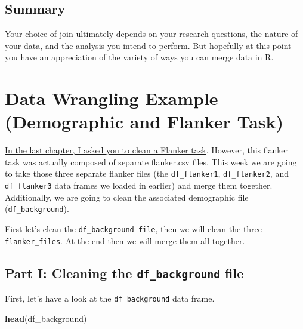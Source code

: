 \documentclass[
]{book}
\newenvironment{Shaded}{\begin{snugshade}}{\end{snugshade}}
\newcommand{\FunctionTok}[1]{\textcolor[rgb]{0.13,0.29,0.53}{\textbf{#1}}}
\newcommand{\NormalTok}[1]{#1}
\begin{document}
\hypertarget{summary-7}{%
\subsection{Summary}\label{summary-7}}

Your choice of join ultimately depends on your research questions, the nature of your data, and the analysis you intend to perform. But hopefully at this point you have an appreciation of the variety of ways you can merge data in R.

\hypertarget{data-wrangling-example-demographic-and-flanker-task}{%
\section{Data Wrangling Example (Demographic and Flanker Task)}\label{data-wrangling-example-demographic-and-flanker-task}}

\protect\hyperlink{clean-activity}{In the last chapter, I asked you to clean a Flanker task}. However, this flanker task was actually composed of separate flanker.csv files. This week we are going to take those three separate flanker files (the \texttt{df\_flanker1}, \texttt{df\_flanker2}, and \texttt{df\_flanker3} data frames we loaded in earlier) and merge them together. Additionally, we are going to clean the associated demographic file (\texttt{df\_background}).

First let's clean the \texttt{df\_background\ file}, then we will clean the three \texttt{flanker\_files}. At the end then we will merge them all together.

\hypertarget{part-i-cleaning-the-df_background-file}{%
\subsection{\texorpdfstring{Part I: Cleaning the \texttt{df\_background} file}{Part I: Cleaning the df\_background file}}\label{part-i-cleaning-the-df_background-file}}

First, let's have a look at the \texttt{df\_background} data frame.

\begin{Shaded}
\begin{Highlighting}[]
\FunctionTok{head}\NormalTok{(df\_background)}
\end{Highlighting}
\end{Shaded}
\end{document}
